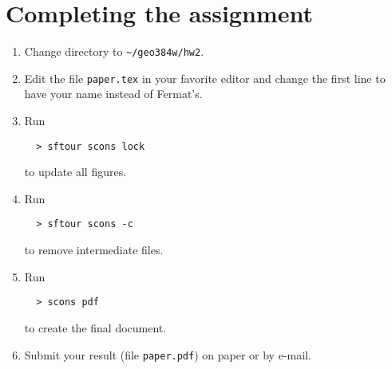 \begin{enumerate}
\end{enumerate}

\newpage

\section{Completing the assignment}

\begin{enumerate}
\item Change directory to \verb#~/geo384w/hw2#.
\item Edit the file \texttt{paper.tex} in your favorite editor and change the
  first line to have your name instead of Fermat's.
\item Run
\begin{verbatim}
  > sftour scons lock
\end{verbatim}
to update all figures.
\item Run
\begin{verbatim}
  > sftour scons -c
\end{verbatim}
  to remove intermediate files.
\item Run
 \begin{verbatim} 
  > scons pdf
\end{verbatim}
  to create the final document.
\item Submit your result (file \texttt{paper.pdf}) on paper or by
  e-mail. 
\end{enumerate}
